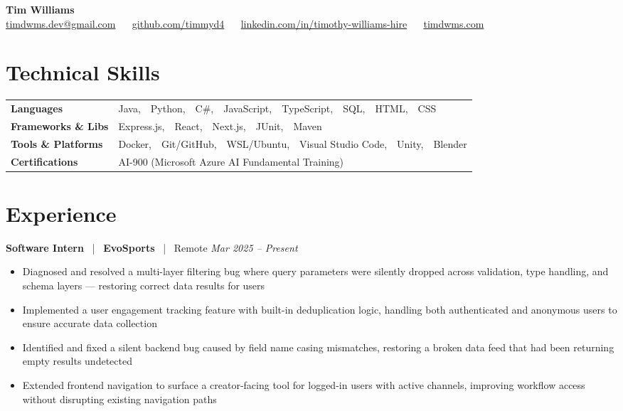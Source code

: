 \documentclass[10pt, letterpaper]{article}
\newcommand{\jobhead}[4]{%
  \vspace{5pt}%
  {\bfseries\color{dark}#1}%
  ~{\color{light}|}~%
  {\bfseries\color{navy}#2}%
  ~{\color{light}|}~%
  {\color{light}#3}%
  \hfill{\color{light}\small\textit{#4}}\\[-2pt]%
}
\newcommand{\skillrow}[2]{%
  {\bfseries #1} & #2 \\[2pt]%
}
\begin{document}

\begin{center}
  {\huge\bfseries\color{navy} Tim Williams}\\[4pt]
  {\small\color{light}
    \href{mailto:timdwms.dev@gmail.com}{timdwms.dev@gmail.com}
    ~\textbullet~
    \href{https://github.com/timmyd4}{github.com/timmyd4}
    ~\textbullet~
    \href{https://www.linkedin.com/in/timothy-williams-hire}{linkedin.com/in/timothy-williams-hire}
    ~\textbullet~
    \href{https://timdwms.com}{timdwms.com}
  }
\end{center}

\vspace{2pt}

\section{Technical Skills}

\begin{tabular}{@{}p{1.6in} p{5.2in}@{}}
  \skillrow{Languages}{Java,\ \ Python,\ \ C\#,\ \ JavaScript,\ \ TypeScript,\ \ SQL,\ \ HTML,\ \ CSS}
  \skillrow{Frameworks \& Libs}{Express.js,\ \ React,\ \ Next.js,\ \ JUnit,\ \ Maven}
  \skillrow{Tools \& Platforms}{Docker,\ \ Git/GitHub,\ \ WSL/Ubuntu,\ \ Visual Studio Code,\ \ Unity,\ \ Blender}
  \skillrow{Certifications}{AI-900 (Microsoft Azure AI Fundamental Training)}
\end{tabular}

\section{Experience}

\jobhead{Software Intern}{EvoSports}{Remote}{Mar 2025 – Present}
\begin{itemize}
  \item Diagnosed and resolved a multi-layer filtering bug where query parameters were silently dropped across validation, type handling, and schema layers — restoring correct data results for users
  \item Implemented a user engagement tracking feature with built-in deduplication logic, handling both authenticated and anonymous users to ensure accurate data collection
  \item Identified and fixed a silent backend bug caused by field name casing mismatches, restoring a broken data feed that had been returning empty results undetected
  \item Extended frontend navigation to surface a creator-facing tool for logged-in users with active channels, improving workflow access without disrupting existing navigation paths
\end{itemize}
\end{document}
